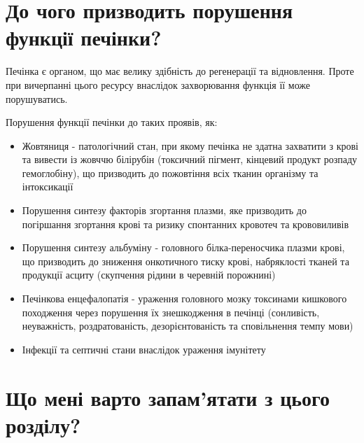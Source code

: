 \section{До чого призводить порушення функції печінки?}
Печінка є органом, що має велику здібність до регенерації та відновлення. Проте при вичерпанні цього ресурсу внаслідок захворювання функція її може порушуватись. 

Порушення функції печінки до таких проявів, як:
\begin{itemize}
  \item Жовтяниця - патологічний стан, при якому печінка не здатна захватити з крові та вивести із жовччю білірубін (токсичний пігмент, кінцевий продукт розпаду гемоглобіну), що призводить до пожовтіння всіх тканин організму та інтоксикації
  \item Порушення синтезу факторів згортання плазми, яке призводить до погіршання згортання крові та ризику спонтанних кровотеч та крововиливів
  \item Порушення синтезу альбуміну - головного білка-переносчика плазми крові, що призводить до зниження онкотичного тиску крові, набряклості тканей та продукції асциту (скупчення рідини в черевній порожнині)
  \item Печінкова енцефалопатія - ураження головного мозку токсинами кишкового походження через порушення їх знешкодження в печінці (сонливість, неуважність, роздратованість, дезорієнтованість та сповільнення темпу мови)
  \item Інфекції та септичні стани внаслідок ураження імунітету
\end{itemize}

\section{\LARGE{Що мені варто запам'ятати з цього розділу?}}



